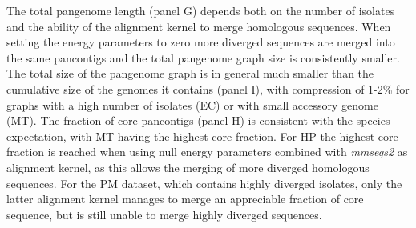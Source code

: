 \documentclass[aps,rmp,reprint,superscriptaddress,notitlepage,10pt,onecolumn]{revtex4-1}
\begin{document}
The total pangenome length (panel G) depends both on the number of isolates and the ability of the alignment kernel to merge homologous sequences. When setting the energy parameters to zero more diverged sequences are merged into the same pancontigs and the total pangenome graph size is consistently smaller. The total size of the pangenome graph is in general much smaller than the cumulative size of the genomes it contains (panel I), with compression of 1-2\% for graphs with a high number of isolates (EC) or with small accessory genome (MT). The fraction of core pancontigs (panel H) is consistent with the species expectation, with MT having the highest core fraction. For HP the highest core fraction is reached when using null energy parameters combined with \textit{mmseqs2} as alignment kernel, as this allows the merging of more diverged homologous sequences. For the PM dataset, which contains highly diverged isolates, only the latter alignment kernel manages to merge an appreciable fraction of core sequence, but is still unable to merge highly diverged sequences.
\end{document}
